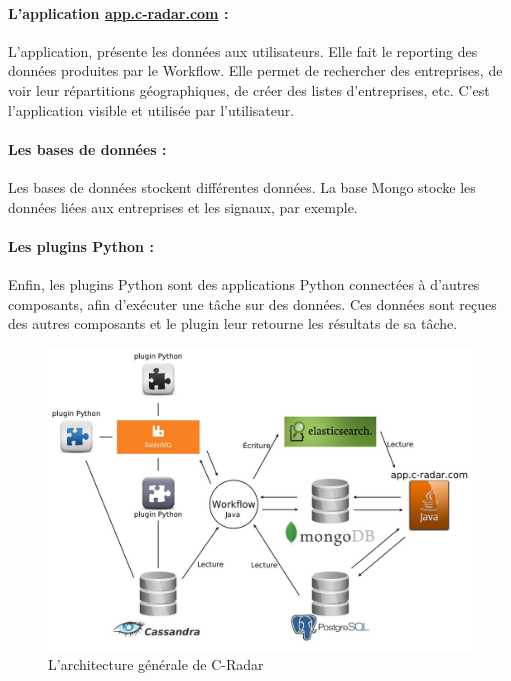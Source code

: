             \paragraph{L'application \href{app.c-radar.com}{app.c-radar.com} :}
                L'application, \og présente \fg les données aux utilisateurs. Elle fait le reporting des données produites par le Workflow. Elle permet de rechercher des entreprises, de voir leur répartitions géographiques, de créer des listes d'entreprises, etc. C'est l'application visible et utilisée par l'utilisateur.

            \paragraph{Les bases de données :}
                Les bases de données stockent différentes données. La base Mongo stocke les données liées aux entreprises et les signaux, par exemple.

            \paragraph{Les plugins Python :}
                Enfin, les plugins Python sont des applications Python connectées à d'autres composants, afin d'exécuter une tâche sur des données. Ces données sont reçues des autres composants et le plugin leur retourne les résultats de sa tâche.

            \color{black}


            \begin{figure}[h!]
                \centering
                \includegraphics[width=\textwidth]{images/archi.jpg}
                \caption{L'architecture générale de C-Radar}
                \label{fig:archi}
            \end{figure}